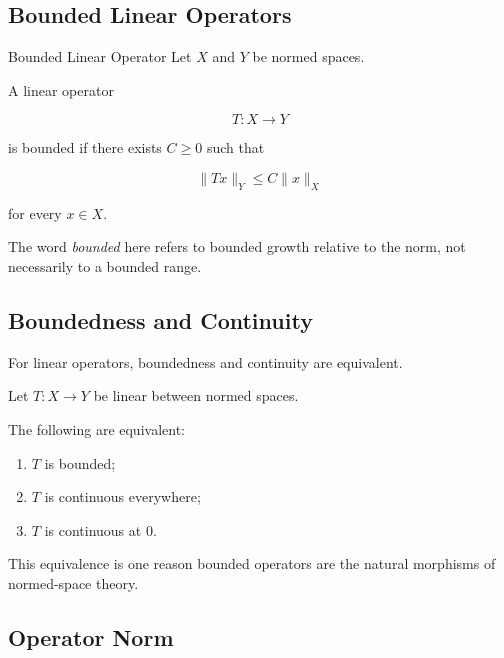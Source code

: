 \subsection{Bounded Linear Operators}
\label{subsec:bounded-linear-operators}

\begin{definitionbox}{Bounded Linear Operator}
Let \(X\) and \(Y\) be normed spaces.

A linear operator

\[
T:X\to Y
\]

is bounded if there exists \(C\geq0\) such that

\[
\boxed{
\|Tx\|_Y
\leq
C\|x\|_X
}
\]

for every \(x\in X\).
\end{definitionbox}

The word \emph{bounded} here refers to bounded growth relative to the norm,
not necessarily to a bounded range.

\subsection{Boundedness and Continuity}
\label{subsec:boundedness-continuity-linear}

For linear operators, boundedness and continuity are equivalent.

\begin{theorem}
Let \(T:X\to Y\) be linear between normed spaces.

The following are equivalent:

\begin{enumerate}
    \item \(T\) is bounded;
    \item \(T\) is continuous everywhere;
    \item \(T\) is continuous at \(0\).
\end{enumerate}
\end{theorem}

This equivalence is one reason bounded operators are the natural
morphisms of normed-space theory.

\subsection{Operator Norm}
\label{subsec:operator-norm}

